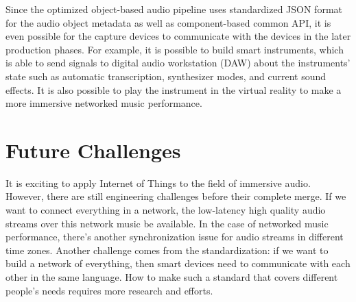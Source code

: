 \documentclass[jou]{apa6}
\begin{document}
Since the optimized object-based audio pipeline uses standardized JSON format for the audio object metadata as well as component-based common API, it is even possible for the capture devices to communicate with the devices in the later production phases. For example, it is possible to build smart instruments, which is able to send signals to digital audio workstation (DAW) about the instruments' state such as automatic transcription, synthesizer modes, and current sound effects. It is also possible to play the instrument in the virtual reality to make a more immersive networked music performance.

\section{Future Challenges}

It is exciting to apply Internet of Things to the field of immersive audio. However, there are still engineering challenges before their complete merge. If we want to connect everything in a network, the low-latency high quality audio streams over this network music be available. In the case of networked music performance, there's another synchronization issue for audio streams in different time zones. Another challenge comes from the standardization: if we want to build a network of everything, then smart devices need to communicate with each other in the same language. How to make such a standard that covers different people's needs requires more research and efforts.

\printbibliography
\end{document}
